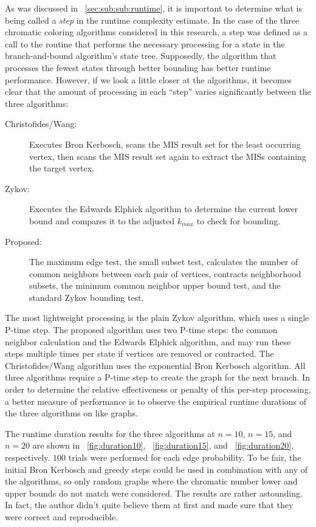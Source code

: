 As was discussed in \sectionname~\ref{sec:sub:sub:runtime}, it is important to determine what is being called a
\emph{step} in the runtime complexity estimate.  In the case of the three chromatic coloring algorithms considered
in this research, a step was defined as a call to the routine that performs the necessary processing for a state in
the branch-and-bound algorithm's state tree.  Supposedly, the algorithm that processes the fewest states through
better bounding has better runtime performance.  However, if we look a little closer at the algorithms, it becomes
clear that the amount of processing in each ``step'' varies significantly between the three algorithms:
\begin{description}
\item[Christofides/Wang:] Executes Bron Kerbosch, scans the MIS result set for the least occurring vertex, then
  scans the MIS result set again to extract the MISs containing the target vertex.
\item [Zykov:] Executes the Edwards Elphick algorithm to determine the current lower bound and compares it to the
  adjusted \(k_{max}\) to check for bounding.
\item [Proposed:] The maximum edge test, the small subset test, calculates the number of common neighbors between
  each pair of vertices, contracts neighborhood subsets, the minimum common neighbor upper bound test, and the
  standard Zykov bounding test.
\end{description}

The most lightweight processing is the plain Zykov algorithm, which uses a single P-time step.  The proposed
algorithm uses two P-time steps: the common neighbor calculation and the Edwards Elphick algorithm, and may run
these steps multiple times per state if vertices are removed or contracted.  The Christofides/Wang algorithm uses
the exponential Bron Kerbosch algorithm.  All three algorithms require a P-time step to create the graph for the
next branch.  In order to determine the relative effectiveness or penalty of this per-step processing, a better
measure of performance is to observe the empirical runtime durations of the three algorithms on like graphs.

The runtime duration results for the three algorithms at \(n=10\), \(n=15\), and \(n=20\) are shown in
\figurename~\ref{fig:duration10}, \figurename~\ref{fig:duration15}, and \figurename~\ref{fig:duration20},
respectively.  \(100\) trials were performed for each edge probability.  To be fair, the initial Bron Kerbosch and
greedy steps could be used in combination with any of the algorithms, so only random graphs where the chromatic
number lower and upper bounds do not match were considered.  The results are rather astounding.  In fact, the
author didn't quite believe them at first and made sure that they were correct and reproducible.

